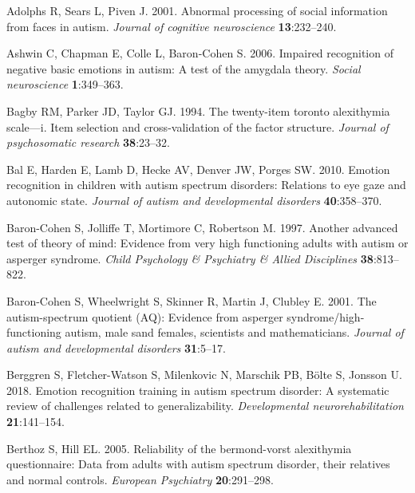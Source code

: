 \documentclass[
]{article}
\newlength{\cslhangindent}
\newlength{\cslentryspacingunit} %
\newenvironment{CSLReferences}[2] %
 {%
  \setlength{\parindent}{0pt}
  \ifodd #1
  \let\oldpar\par
  \def\par{\hangindent=\cslhangindent\oldpar}
  \fi
  \setlength{\parskip}{#2\cslentryspacingunit}
 }%
 {}
\begin{document}
\hypertarget{refs}{}
\begin{CSLReferences}{1}{0}
\leavevmode{}%
Adolphs R, Sears L, Piven J. 2001. Abnormal processing of social information from faces in autism. \emph{Journal of cognitive neuroscience} \textbf{13}:232--240.

\leavevmode{}%
Ashwin C, Chapman E, Colle L, Baron-Cohen S. 2006. Impaired recognition of negative basic emotions in autism: A test of the amygdala theory. \emph{Social neuroscience} \textbf{1}:349--363.

\leavevmode{}%
Bagby RM, Parker JD, Taylor GJ. 1994. The twenty-item toronto alexithymia scale---i. Item selection and cross-validation of the factor structure. \emph{Journal of psychosomatic research} \textbf{38}:23--32.

\leavevmode{}%
Bal E, Harden E, Lamb D, Hecke AV, Denver JW, Porges SW. 2010. Emotion recognition in children with autism spectrum disorders: Relations to eye gaze and autonomic state. \emph{Journal of autism and developmental disorders} \textbf{40}:358--370.

\leavevmode{}%
Baron-Cohen S, Jolliffe T, Mortimore C, Robertson M. 1997. Another advanced test of theory of mind: Evidence from very high functioning adults with autism or asperger syndrome. \emph{Child Psychology \& Psychiatry \& Allied Disciplines} \textbf{38}:813--822.

\leavevmode{}%
Baron-Cohen S, Wheelwright S, Skinner R, Martin J, Clubley E. 2001. The autism-spectrum quotient (AQ): Evidence from asperger syndrome/high-functioning autism, male sand females, scientists and mathematicians. \emph{Journal of autism and developmental disorders} \textbf{31}:5--17.

\leavevmode{}%
Berggren S, Fletcher-Watson S, Milenkovic N, Marschik PB, Bölte S, Jonsson U. 2018. Emotion recognition training in autism spectrum disorder: A systematic review of challenges related to generalizability. \emph{Developmental neurorehabilitation} \textbf{21}:141--154.

\leavevmode{}%
Berthoz S, Hill EL. 2005. Reliability of the bermond-vorst alexithymia questionnaire: Data from adults with autism spectrum disorder, their relatives and normal controls. \emph{European Psychiatry} \textbf{20}:291--298.


\end{CSLReferences}
\end{document}
